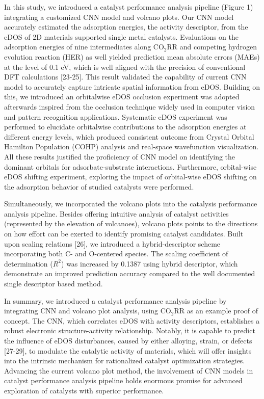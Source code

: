 In this study, we introduced a catalyst performance analysis pipeline (Figure 1) integrating a customized CNN model and volcano plots.
Our CNN model accurately estimated the adsorption energies, the activity descriptor, from the eDOS of 2D materials supported single metal catalysts.
Evaluations on the adsorption energies of nine intermediates along CO$_2$RR and competing hydrogen evolution reaction (HER) as well yielded prediction mean absolute errors (MAEs) at the level of 0.1 eV, which is well aligned with the precision of conventional DFT calculations [23-25].
This result validated the capability of current CNN model to accurately capture intricate spatial information from eDOS.
Building on this, we introduced an orbitalwise eDOS occlusion experiment was adopted afterwards inspired from the occlusion technique widely used in computer vision and pattern recognition applications.
Systematic eDOS experiment was performed to elucidate orbitalwise contributions to the adsorption energies at different energy levels, which produced consistent outcome from Crystal Orbital Hamilton Population (COHP) analysis and real-space wavefunction visualization.
All these results justified the proficiency of CNN model on identifying the dominant orbitals for adsorbate-substrate interactions.
Furthermore, orbital-wise eDOS shifting experiment, exploring the impact of orbital-wise eDOS shifting on the adsorption behavior of studied catalysts were performed.

Simultaneously, we incorporated the volcano plots into the catalysis performance analysis pipeline.
Besides offering intuitive analysis of catalyst activities (represented by the elevation of volcanoes), volcano plots points to the directions on how effort can be exerted to identify promising catalyst candidates.
Built upon scaling relations [26], we introduced a hybrid-descriptor scheme incorporating both C- and O-centered species.
The scaling coefficient of determination ($R^2$) was increased by 0.1387 using hybrid descriptor, which demonstrate an improved prediction accuracy compared to the well documented single descriptor based method.

In summary, we introduced a catalyst performance analysis pipeline by integrating CNN and volcano plot analysis, using CO$_2$RR as an example proof of concept.
The CNN, which correlates eDOS with activity descriptors, establishes a robust electronic structure-activity relationship.
Notably, it is capable to predict the influence of eDOS disturbances, caused by either alloying, strain, or defects [27-29], to modulate the catalytic activity of materials, which will offer insights into the intrinsic mechanism for rationalized catalyst optimization strategies.
Advancing the current volcano plot method, the involvement of CNN models in catalyst performance analysis pipeline holds enormous promise for advanced exploration of catalysts with superior performance.
